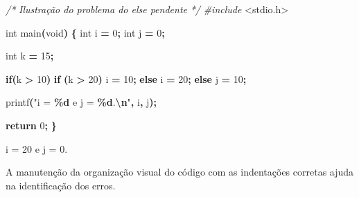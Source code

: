 \documentclass[
  11pt,
  a4paper,
]{scrbook}
\newenvironment{Shaded}{\begin{snugshade}}{\end{snugshade}}
\newcommand{\CommentTok}[1]{\textcolor[rgb]{0.56,0.35,0.01}{\textit{#1}}}
\newcommand{\ControlFlowTok}[1]{\textcolor[rgb]{0.13,0.29,0.53}{\textbf{#1}}}
\newcommand{\DataTypeTok}[1]{\textcolor[rgb]{0.13,0.29,0.53}{#1}}
\newcommand{\DecValTok}[1]{\textcolor[rgb]{0.00,0.00,0.81}{#1}}
\newcommand{\ImportTok}[1]{#1}
\newcommand{\NormalTok}[1]{#1}
\newcommand{\OperatorTok}[1]{\textcolor[rgb]{0.81,0.36,0.00}{\textbf{#1}}}
\newcommand{\PreprocessorTok}[1]{\textcolor[rgb]{0.56,0.35,0.01}{\textit{#1}}}
\newcommand{\SpecialCharTok}[1]{\textcolor[rgb]{0.81,0.36,0.00}{\textbf{#1}}}
\newcommand{\StringTok}[1]{\textcolor[rgb]{0.31,0.60,0.02}{#1}}
\begin{document}
\begin{Shaded}
\begin{Highlighting}[]
\CommentTok{/*}
\CommentTok{Ilustração do problema do else pendente}
\CommentTok{*/}
\PreprocessorTok{\#include }\ImportTok{\textless{}stdio.h\textgreater{}}

\DataTypeTok{int}\NormalTok{ main}\OperatorTok{(}\DataTypeTok{void}\OperatorTok{)} \OperatorTok{\{}
    \DataTypeTok{int}\NormalTok{ i }\OperatorTok{=} \DecValTok{0}\OperatorTok{;}
    \DataTypeTok{int}\NormalTok{ j }\OperatorTok{=} \DecValTok{0}\OperatorTok{;}

    \DataTypeTok{int}\NormalTok{ k }\OperatorTok{=} \DecValTok{15}\OperatorTok{;}

    \ControlFlowTok{if}\OperatorTok{(}\NormalTok{k }\OperatorTok{\textgreater{}} \DecValTok{10}\OperatorTok{)} 
        \ControlFlowTok{if} \OperatorTok{(}\NormalTok{k }\OperatorTok{\textgreater{}} \DecValTok{20}\OperatorTok{)}
\NormalTok{            i }\OperatorTok{=} \DecValTok{10}\OperatorTok{;}
        \ControlFlowTok{else}
\NormalTok{            i }\OperatorTok{=} \DecValTok{20}\OperatorTok{;}
    \ControlFlowTok{else} 
\NormalTok{        j }\OperatorTok{=} \DecValTok{10}\OperatorTok{;}

\NormalTok{    printf}\OperatorTok{(}\StringTok{"i = }\SpecialCharTok{\%d}\StringTok{ e j = }\SpecialCharTok{\%d}\StringTok{.}\SpecialCharTok{\textbackslash{}n}\StringTok{"}\OperatorTok{,}\NormalTok{ i}\OperatorTok{,}\NormalTok{ j}\OperatorTok{);}
    
    \ControlFlowTok{return} \DecValTok{0}\OperatorTok{;}
\OperatorTok{\}}
\end{Highlighting}
\end{Shaded}

\begin{Shaded}
\begin{Highlighting}[]
\NormalTok{i = 20 e j = 0.}
\end{Highlighting}
\end{Shaded}

\begin{tcolorbox}[enhanced jigsaw, arc=.35mm, bottomtitle=1mm, colbacktitle=quarto-callout-tip-color!10!white, title=\textcolor{quarto-callout-tip-color}{\faLightbulb}\hspace{0.5em}{Dica}, toprule=.15mm, left=2mm, opacityback=0, colback=white, colframe=quarto-callout-tip-color-frame, opacitybacktitle=0.6, bottomrule=.15mm, leftrule=.75mm, toptitle=1mm, coltitle=black, titlerule=0mm, rightrule=.15mm, breakable]

A manutenção da organização visual do código com as indentações corretas
ajuda na identificação dos erros.

\end{tcolorbox}
\end{document}
